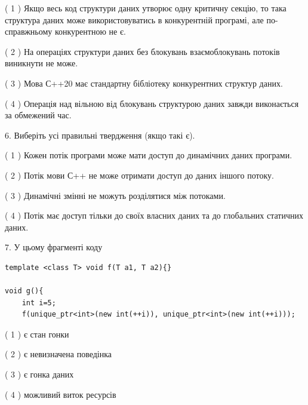 \documentclass[12pt, ukrainian]{article}
\begin{document}
\begin {large}
{( 1 ) Якщо весь код структури даних утворює одну критичну секцію, то така структура даних може використовуватись в конкурентній програмі, але по-справжньо\-му конкурентною не є.%

( 2 ) На операціях структури даних без блокувань взаємоблокувань потоків виникнути не може.%

( 3 ) Мова С++20 має стандартну бібліотеку конкурентних структур даних.%

( 4 ) Операція над вільною від блокувань структурою даних завжди виконається за обмежений час.%
\newpage



\vspace{5mm}
6. Виберіть усі правильні твердження (якщо такі є).\par
\vspace{2mm}

( 1 ) Кожен потік програми може мати доступ до динамічних даних програми.%

( 2 ) Потік мови С++ не може отримати доступ до даних іншого потоку.%

( 3 ) Динамічні змінні не можуть розділятися між потоками.%

( 4 ) Потік має доступ тільки до своїх власних даних та до глобальних статичних даних.%


\vspace{5mm}
7. У цьому фрагменті коду
\begin{verbatim}
template <class T> void f(T a1, T a2){}

void g(){
    int i=5;
    f(unique_ptr<int>(new int(++i)), unique_ptr<int>(new int(++i)));
\end{verbatim}

( 1 ) є стан гонки%

( 2 ) є невизначена поведінка%

( 3 ) є гонка даних%

( 4 ) можливий виток ресурсів%
}
\end {large}
\end{document}
